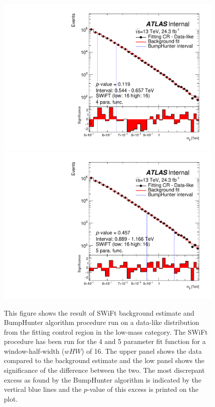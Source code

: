 \begin{figure}[!htb]
\captionsetup[subfigure]{aboveskip=0pt,justification=centering}
\centering
{} {
  \includegraphics[width=0.45\linewidth, angle=0]{figs/Dibjet/LowMass/FitStudy/bhFit_corrFitCR_dataLike_v13_4para_low16_high16.pdf}
}
 {
  \includegraphics[width=0.45\linewidth, angle=0]{figs/Dibjet/LowMass/FitStudy/bhFit_corrFitCR_dataLike_v13_5para_low16_high16.pdf}
}
\vspace{10pt}
\caption{\label{fig:bhFit_lm_corrFitCR_dataLike}
  This figure shows the result of SWiFt background estimate and {\sc BumpHunter} algorithm procedure run on a data-like distribution
  from the fitting control region in the low-mass category.
  The SWiFt procedure has been run for the 4 and 5 parameter fit function for a window-half-width ($wHW$) of 16.
  The upper panel shows the data compared to the background estimate and the low panel shows the significance of the difference between the two.
  The most discrepant excess as found by the {\sc BumpHunter} algorithm is indicated by the vertical blue lines and the $p$-value of this excess is printed on the plot. 
}
\end{figure}

